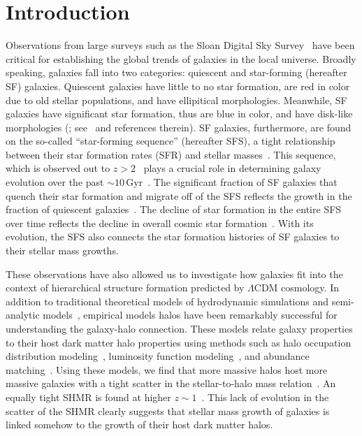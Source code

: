 \documentclass[12pt, letterpaper, preprint, tighten]{aastex62}
\newcommand{\edt}[1]{{\color{dred}{\bf} #1}}
\begin{document}
\section{Introduction}
Observations from large surveys such as the Sloan Digital Sky Survey~\citep[SDSS;][]{york2000} 
have been critical for establishing the global trends of galaxies in 
the local universe. Broadly speaking, galaxies fall into two categories: 
quiescent and star-forming (hereafter SF) galaxies. Quiescent galaxies 
have little to no star formation, are red in color 
\edt{due to old stellar populations}, 
and have ellipitical 
morphologies. Meanwhile, SF galaxies have significant star formation, 
\edt{thus} 
are blue in color, and have disk-like morphologies (\citealt{kauffmann2003, blanton2003, baldry2006, taylor2009, moustakas2013}; 
see~\citealt{blanton2009} and references therein). 
SF galaxies, furthermore, are found on the so-called ``star-forming sequence'' 
(hereafter SFS), a tight relationship between their star formation rates (SFR) 
and stellar masses~\citep[][see also Figure~\ref{fig:groupcat}]{noeske2007, daddi2007, salim2007, speagle2014, lee2015}.
This sequence, which is observed out to $z > 2$~\citep{wang2013, leja2015} 
plays a crucial role in 
\edt{determining}
galaxy evolution over the past ${\sim}10\,\mathrm{Gyr}$~\citep[see][for an alternative point of view]{kelson2014,abramson2016}. 
The significant fraction of SF galaxies that quench their 
star formation and migrate off of the SFS reflects the growth in the 
fraction of quiescent galaxies~\citep{blanton2006, borch2006, bundy2006, moustakas2013}. 
The decline of star formation in the entire SFS~\citep{lee2015, schreiber2015} 
over time reflects the decline in overall cosmic star formation~\citep{hopkins2006, behroozi2013, madau2014}.
With its evolution, the SFS also connects the star formation histories of SF 
galaxies to their stellar mass growths.

These observations have also allowed us to investigate how galaxies fit 
into the context of hierarchical structure formation predicted
by $\Lambda$CDM cosmology. In addition to traditional theoretical 
models of hydrodynamic simulations and semi-analytic 
models~\citep[see][for reviews]{silk2012, somerville2015}, 
empirical models halos have been remarkably successful for 
understanding the galaxy-halo connection. These models relate galaxy 
properties to their host dark matter halo properties using methods such as 
halo occupation distribution modeling~\citep[HOD; \emph{e.g.}][]{zheng2007,zehavi2011,leauthaud2012,parejko2013,zu2015}, 
luminosity function modeling~\citep[\emph{e.g.}][]{yang2009}, and abundance 
matching~\citep[\emph{e.g.}][]{kravtsov2004, vale2006, conroy2009, moster2013, reddick2013}.
Using these models, we find that more massive halos host more 
massive galaxies with a tight scatter in the stellar-to-halo 
mass relation~\citep[hereafter SHMR;][]{mandelbaum2006a, conroy2007, more2011, leauthaud2012, tinker2013, velander2014, han2015, zu2015, gu2016, lange2018a}. An equally tight SHMR is found at higher 
$z\sim1$~\citep{leauthaud2012, tinker2013, patel2015}. This lack of
evolution in the scatter of the SHMR clearly suggests that stellar 
mass growth of galaxies is linked somehow to the growth 
of their host dark matter halos.
\end{document}
